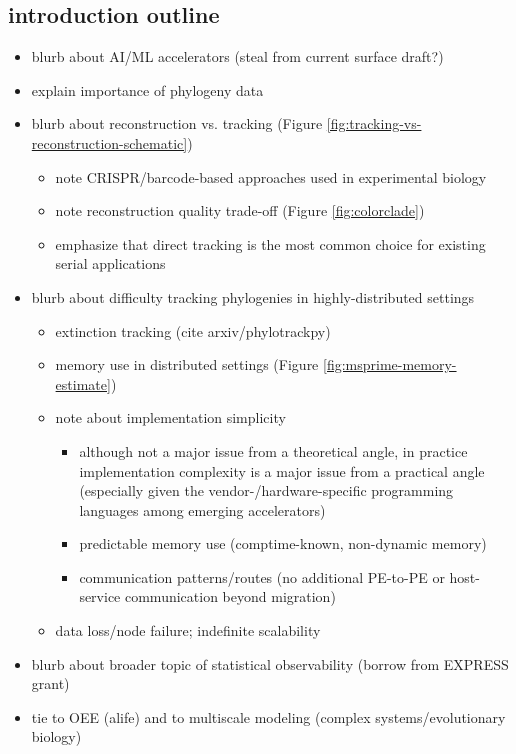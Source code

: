 \subsection{introduction outline}

\begin{itemize}
\item blurb about AI/ML accelerators (steal from current surface draft?)
\item explain importance of phylogeny data
\item blurb about reconstruction vs. tracking (Figure \ref{fig:tracking-vs-reconstruction-schematic})
    \begin{itemize}
    \item note CRISPR/barcode-based approaches used in experimental biology
    \item note reconstruction quality trade-off (Figure \ref{fig:colorclade})
    \item emphasize that direct tracking is the most common choice for existing serial applications
    \end{itemize}
\item blurb about difficulty tracking phylogenies in highly-distributed settings
   \begin{itemize}
   \item extinction tracking (cite arxiv/phylotrackpy)
   \item memory use in distributed settings (Figure \ref{fig:msprime-memory-estimate})
   \item note about implementation simplicity
      \begin{itemize}
      \item although not a major issue from a theoretical angle, in practice implementation complexity is a major issue from a practical angle (especially given the vendor-/hardware-specific programming languages among emerging accelerators)
      \item predictable memory use (comptime-known, non-dynamic memory)
      \item communication patterns/routes (no additional PE-to-PE or host-service communication beyond migration)
      \end{itemize}
   \item data loss/node failure; indefinite scalability
   \end{itemize}
\item blurb about broader topic of statistical observability (borrow from EXPRESS grant)
\item tie to OEE (alife) and to multiscale modeling (complex systems/evolutionary biology)

\end{itemize}
